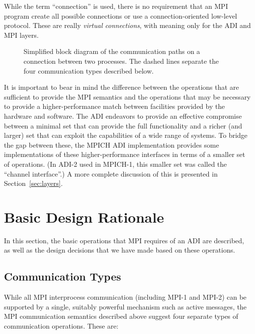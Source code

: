 While the term ``connection'' is used, there is no requirement that an MPI
program create all possible connections or use a connection-oriented low-level
protocol.  These are really \emph{virtual connections}, with meaning only for
the ADI and MPI layers.

\begin{figure}
\centerline{}
\caption{Simplified block diagram of the communication paths on a connection
  between two processes.  The dashed lines separate the four communication
  types described below.} 
\label{fig:adi-overview}
\end{figure}

It is important to bear in mind the difference between the operations that are
sufficient to provide the MPI semantics and the operations that may be
necessary to provide a higher-performance match between facilities
provided by the hardware and software.  The ADI endeavors to provide
an effective compromise between a minimal set that can provide the
full functionality and a richer (and larger) set that can exploit the
capabilities of a wide range of systems.  To bridge the gap between
these, the MPICH ADI implementation provides some implementations of
these higher-performance interfaces in terms of a smaller set of
operations.  (In ADI-2 used in MPICH-1, this smaller set was called
the ``channel interface''.)  A more complete discussion of this is
presented in Section~\ref{sec:layers}.

\section{Basic Design Rationale}
\label{sec:basic-design}
In this section, the basic operations that MPI requires of an ADI are
described, as well as the design decisions that we have made based on these
operations.

\subsection{Communication Types}
\label{sec:comm-types}

While all MPI interprocess communication (including MPI-1 and MPI-2)
can be supported by a single, suitably powerful mechanism such as
active messages, the MPI communication semantics described above
suggest four separate types of communication operations.  These are:

